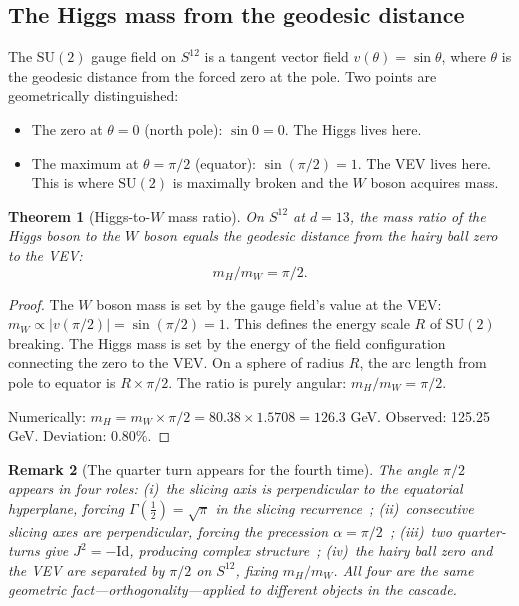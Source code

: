 \documentclass[12pt,a4paper]{article}
\newtheorem{theorem}{Theorem}[section]
\newtheorem{remark}[theorem]{Remark}
\begin{document}
\subsection{The Higgs mass from the geodesic distance}

The $\mathrm{SU}(2)$ gauge field on $S^{12}$ is a tangent vector field $v(\theta)=\sin\theta$,
where $\theta$ is the geodesic distance from the forced zero at the pole. Two points are
geometrically distinguished:
\begin{itemize}
\item The zero at $\theta=0$ (north pole): $\sin 0=0$. The Higgs lives here.
\item The maximum at $\theta=\pi/2$ (equator): $\sin(\pi/2)=1$. The VEV lives here. This
is where $\mathrm{SU}(2)$ is maximally broken and the $W$ boson acquires mass.
\end{itemize}

\begin{theorem}[Higgs-to-$W$ mass ratio]\label{thm:higgs}
On $S^{12}$ at $d=13$, the mass ratio of the Higgs boson to the $W$ boson equals the
geodesic distance from the hairy ball zero to the VEV:
\[
m_H/m_W = \pi/2.
\]
\end{theorem}
\begin{proof}
The $W$ boson mass is set by the gauge field's value at the VEV:
$m_W\propto|v(\pi/2)|=\sin(\pi/2)=1$. This defines the energy scale $R$ of $\mathrm{SU}(2)$
breaking. The Higgs mass is set by the energy of the field configuration connecting the zero
to the VEV. On a sphere of radius $R$, the arc length from pole to equator is $R\times\pi/2$.
The ratio is purely angular: $m_H/m_W=\pi/2$.

Numerically: $m_H=m_W\times\pi/2=80.38\times 1.5708=126.3$ GeV. Observed: 125.25 GeV.
Deviation: 0.80\%.
\end{proof}

\begin{remark}[The quarter turn appears for the fourth time]
The angle $\pi/2$ appears in four roles: (i)~the slicing axis is perpendicular to the
equatorial hyperplane, forcing $\Gamma(\tfrac{1}{2})=\sqrt{\pi}$ in the slicing
recurrence~\cite{paperI}; (ii)~consecutive slicing axes are perpendicular, forcing the
precession $\alpha=\pi/2$~\cite{paperII}; (iii)~two quarter-turns give $J^2=-\mathrm{Id}$,
producing complex structure~\cite{paperII}; (iv)~the hairy ball zero and the VEV are
separated by $\pi/2$ on $S^{12}$, fixing $m_H/m_W$. All four are the same geometric
fact---orthogonality---applied to different objects in the cascade.
\end{remark}
\end{document}
